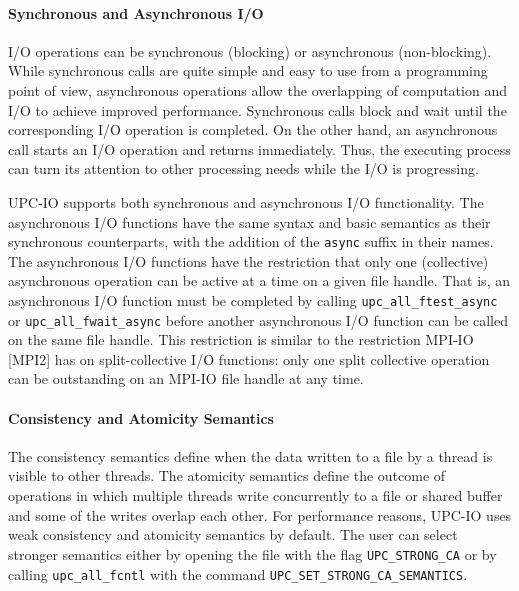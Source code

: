 \paragraph{Synchronous and Asynchronous I/O}

\npf I/O operations can be synchronous (blocking) or asynchronous (non-blocking).
While synchronous calls are quite simple and easy to use from a programming
point of view, asynchronous operations allow the overlapping of computation
and I/O to achieve improved performance. Synchronous calls block and wait
until the corresponding I/O operation is completed. On the other hand, an
asynchronous call starts an I/O operation and returns immediately. Thus, the
executing process can turn its attention to other processing needs while the
I/O is progressing.

\np UPC-IO supports both synchronous and asynchronous I/O functionality. The
asynchronous I/O functions have the same syntax and basic semantics as their synchronous
counterparts, with the addition of the {\tt async} suffix in their names. The
asynchronous I/O functions have the restriction that only one (collective)
asynchronous operation can be active at a time on a given file handle. That
is, an asynchronous I/O function must be completed by calling
{\tt upc\_all\_ftest\_async} or {\tt upc\_all\_fwait\_async} before another asynchronous
I/O function can be called on the same file handle. This restriction is
similar to the restriction MPI-IO [MPI2] has on split-collective I/O functions:
only one split collective operation can be outstanding on an MPI-IO file
handle at any time.

\paragraph{Consistency and Atomicity Semantics}

\npf The consistency semantics define when the data written
to a file by a thread is visible to other threads. The atomicity semantics
define the outcome of operations in which multiple threads write
concurrently to a file or shared buffer and some of the writes overlap each other. For
performance reasons, UPC-IO uses weak consistency and
atomicity semantics by default. The user can select stronger semantics either by
opening the file with the flag {\tt UPC\_STRONG\_CA} or by calling 
{\tt upc\_all\_fcntl} with the command 
{\tt UPC\_SET\_STRONG\_CA\_SEMANTICS}.

